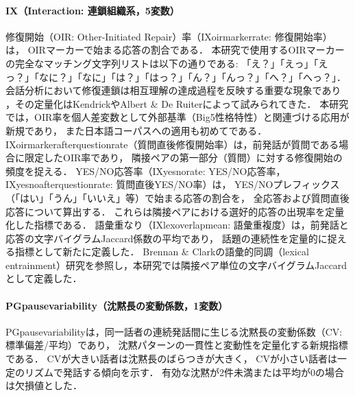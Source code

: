 \documentclass[dvipdfmx,11pt,a4paper]{bxjsarticle}
\renewcommand{\_}{\paperorigunderscore\allowbreak}%
\begin{document}
\paragraph{IX（Interaction: 連鎖組織系，5変数）}
修復開始（OIR: Other-Initiated Repair）率（IX\_oirmarker\_rate: 修復開始率）は，
OIRマーカーで始まる応答の割合である．
本研究で使用するOIRマーカーの完全なマッチング文字列リストは以下の通りである:
「え？」「えっ」「えっ？」「なに？」「なに」「は？」「はっ？」「ん？」「んっ？」「へ？」「へっ？」．
会話分析において修復連鎖は相互理解の達成過程を反映する重要な現象であり
\cite{schegloff1977}，その定量化はKendrick\cite{kendrick2015}やAlbert \& De Ruiter\cite{albert2018}によって試みられてきた．
本研究では，OIR率を個人差変数として外部基準（Big5性格特性）と関連づける応用が新規であり，
また日本語コーパスへの適用も初めてである．
IX\_oirmarker\_after\_question\_rate（質問直後修復開始率）は，前発話が質問である場合に限定したOIR率であり，
隣接ペアの第一部分（質問）に対する修復開始の頻度を捉える．
YES/NO応答率（IX\_yesno\_rate: YES/NO応答率，IX\_yesno\_after\_question\_rate: 質問直後YES/NO率）は，
YES/NOプレフィックス（「はい」「うん」「いいえ」等）で始まる応答の割合を，
全応答および質問直後応答について算出する．
これらは隣接ペアにおける選好的応答の出現率を定量化した指標である．
語彙重なり（IX\_lex\_overlap\_mean: 語彙重複度）は，前発話と応答の文字バイグラムJaccard係数の平均であり，
話題の連続性を定量的に捉える指標として新たに定義した．
Brennan \& Clark\cite{brennan1996}の語彙的同調（lexical entrainment）研究を参照し，本研究では隣接ペア単位の文字バイグラムJaccardとして定義した．

\paragraph{PG\_pause\_variability（沈黙長の変動係数，1変数）}
PG\_pause\_variabilityは，同一話者の連続発話間に生じる沈黙長の変動係数（CV: 標準偏差/平均）であり，
沈黙パターンの一貫性と変動性を定量化する新規指標である．
CVが大きい話者は沈黙長のばらつきが大きく，
CVが小さい話者は一定のリズムで発話する傾向を示す．
有効な沈黙が2件未満または平均が0の場合は欠損値とした．
\end{document}
